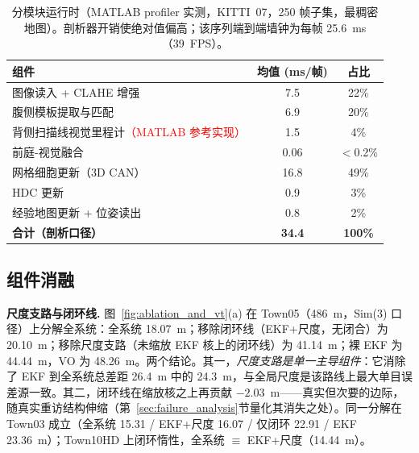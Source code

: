\begin{table}[!t]
    \centering
    \setlength{\tabcolsep}{3pt}
    \footnotesize
    \caption{分模块运行时（MATLAB profiler 实测，KITTI~07，250 帧子集，最稠密地图）。剖析器开销使绝对值偏高；该序列端到端墙钟为每帧 25.6~ms（39~FPS）。}
    \label{tab:runtime}
    \begin{tabular}{lcc}
        \toprule
        组件                            & 均值 (ms/帧)   & 占比           \\
        \midrule
        图像读入 + CLAHE 增强            & 7.5            & 22\%           \\
        腹侧模板提取与匹配               & 6.9            & 20\%           \\
        背侧扫描线视觉里程计\textcolor{red}{（MATLAB 参考实现）}             & 1.5            & 4\%            \\
        前庭-视觉融合                    & 0.06           & $<$0.2\%       \\
        网格细胞更新（3D CAN）           & 16.8           & 49\%           \\
        HDC 更新                         & 0.9            & 3\%            \\
        经验地图更新 + 位姿读出          & 0.8            & 2\%            \\
        \midrule
        \textbf{合计（剖析口径）}        & \textbf{34.4}  & \textbf{100\%} \\
        \bottomrule
    \end{tabular}
\end{table}

\subsection{组件消融}
\label{sec:ablation}

\textbf{尺度支路与闭环线.} 图~\ref{fig:ablation_and_vt}(a) 在 Town05（486~m，Sim(3) 口径）上分解全系统：全系统 18.07~m；移除闭环线（EKF+尺度，无闭合）为 20.10~m；移除尺度支路（未缩放 EKF 核上的闭环线）为 41.14~m；裸 EKF 为 44.44~m，VO 为 48.26~m。两个结论。其一，\emph{尺度支路是单一主导组件}：它消除了 EKF 到全系统总差距 26.4~m 中的 24.3~m，与全局尺度是该路线上最大单目误差源一致。其二，闭环线在缩放核之上再贡献 $-2.03$~m——真实但次要的边际，随真实重访结构伸缩（第~\ref{sec:failure_analysis}节量化其消失之处）。同一分解在 Town03 成立（全系统 15.31 / EKF+尺度 16.07 / 仅闭环 22.91 / EKF 23.36~m）；Town10HD 上闭环惰性，全系统 $\equiv$ EKF+尺度（14.44~m）。


